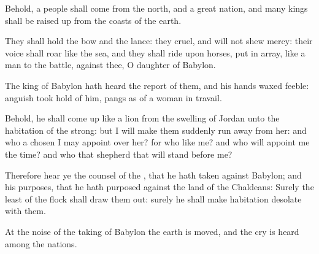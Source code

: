{Behold, a
people shall
come from the
north, and a
great
nation, and
many
kings shall be raised
up from the
coasts of the
earth.

They shall
hold the
bow and the
lance: they
{}
cruel, and will not shew
mercy: their
voice shall
roar like the
sea, and they shall
ride upon
horses,
{} put in
array, like a
man to the
battle, against thee, O
daughter of
Babylon.

The
king of
Babylon hath
heard the
report of them, and his
hands waxed
feeble:
anguish took
hold of him,
{}
pangs as of a woman in
travail.

Behold, he shall come
up like a
lion from the
swelling of
Jordan unto the
habitation of the
strong: but I will
make them
suddenly run
away from her: and who
{} a
chosen
{} I may
appoint over her? for who
{} like me? and who will appoint me the
time? and who
{} that
shepherd that will
stand
before me?

Therefore
hear ye the
counsel of the
{}, that he hath
taken against
Babylon; and his
purposes, that he hath
purposed against the
land of the
Chaldeans: Surely the
least of the
flock shall draw them
out: surely he shall make
{}
habitation
desolate with them.

At the
noise of the
taking of
Babylon the
earth is
moved, and the
cry is
heard among the
nations.




\par }
